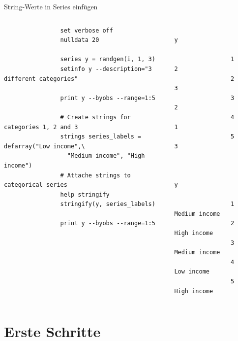 \documentclass{beamer}[11pt]
\begin{document}
\begin{frame}[fragile]{String-Werte in Series einfügen}
	\begin{columns}[T] %
		\scriptsize
		\begin{column}{.6\textwidth}
			\begin{verbatim}
				set verbose off
				nulldata 20

				series y = randgen(i, 1, 3)
				setinfo y --description="3 different categories"

				print y --byobs --range=1:5

				# Create strings for categories 1, 2 and 3
				strings series_labels = defarray("Low income",\
				  "Medium income", "High income")
				# Attache strings to categorical series
				help stringify
				stringify(y, series_labels)

				print y --byobs --range=1:5
			\end{verbatim}
		\end{column}

		\begin{column}{.4\textwidth}
			\tiny
			\begin{verbatim}
				           y

				1            2
				2            3
				3            2
				4            1
				5            3


				        y

				1 Medium income
				2   High income
				3 Medium income
				4    Low income
				5   High income

			\end{verbatim}
	  \end{column}
	\end{columns}
\end{frame}




\section{Erste Schritte}
\end{document}
